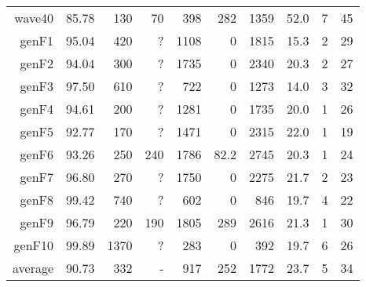 \begin{table}
\begin{tabular}{|r|r|r|r|r|r|r|r|r|r|}
{\sc wave40} & 85.78 & 130 & 70 & 398 & 282 & 1359 & 52.0 & 7 & 45 \\
{\sc genF1} & 95.04 & 420 & ? & 1108 & 0 & 1815 & 15.3 & 2 & 29 \\
{\sc genF2} & 94.04 & 300 & ? & 1735 & 0 & 2340 & 20.3 & 2 & 27 \\
{\sc genF3} & 97.50 & 610 & ? & 722 & 0 & 1273 & 14.0 & 3 & 32 \\
{\sc genF4} & 94.61 & 200 & ? & 1281 & 0 & 1735 & 20.0 & 1 & 26 \\
{\sc genF5} & 92.77 & 170 & ? & 1471 & 0 & 2315 & 22.0 & 1 & 19 \\
{\sc genF6} & 93.26 & 250 & 240 & 1786 & 82.2 & 2745 & 20.3 & 1 & 24 \\
{\sc genF7} & 96.80 & 270 & ? & 1750 & 0 & 2275 & 21.7 & 2 & 23 \\
{\sc genF8} & 99.42 & 740 & ? & 602 & 0 & 846 & 19.7 & 4 & 22 \\
{\sc genF9} & 96.79 & 220 & 190 & 1805 & 289 & 2616 & 21.3 & 1 & 30 \\
{\sc genF10} & 99.89 & 1370 & ? & 283 & 0 & 392 & 19.7 & 6 & 26 \\
\hline
average & 90.73 & 332 &  -  & 917 & 252 & 1772 & 23.7 & 5 & 34 \\
\hline
\end{tabular}
\end{table}
\clearpage
